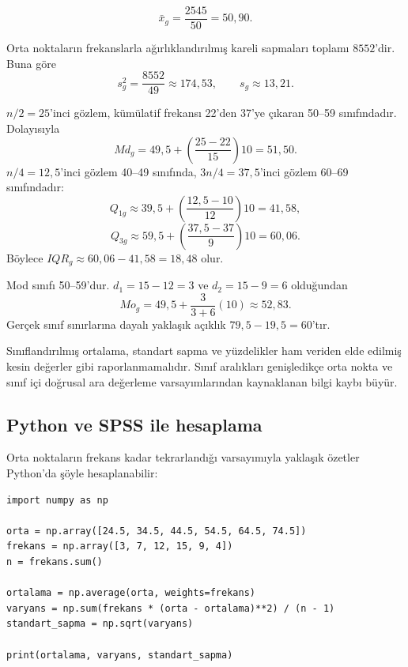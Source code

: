 
\[
\bar{x}_g=\frac{2545}{50}=50{,}90.
\]


Orta noktaların frekanslarla ağırlıklandırılmış kareli sapmaları toplamı
$8552$'dir. Buna göre
\[
s_g^2=\frac{8552}{49}\approx174{,}53,
\qquad
s_g\approx13{,}21.
\]


$n/2=25$'inci gözlem, kümülatif frekansı 22'den 37'ye çıkaran 50--59
sınıfındadır. Dolayısıyla
\[
Md_g=49{,}5+\left(\frac{25-22}{15}\right)10=51{,}50.
\]
$n/4=12{,}5$'inci gözlem 40--49 sınıfında,
$3n/4=37{,}5$'inci gözlem 60--69 sınıfındadır:
\[
Q_{1g}\approx39{,}5+\left(\frac{12{,}5-10}{12}\right)10=41{,}58,
\]
\[
Q_{3g}\approx59{,}5+\left(\frac{37{,}5-37}{9}\right)10=60{,}06.
\]
Böylece $IQR_g\approx60{,}06-41{,}58=18{,}48$ olur.


Mod sınıfı 50--59'dur. $d_1=15-12=3$ ve $d_2=15-9=6$ olduğundan
\[
Mo_g=49{,}5+\frac{3}{3+6}(10)\approx52{,}83.
\]
Gerçek sınıf sınırlarına dayalı yaklaşık açıklık $79{,}5-19{,}5=60$'tır.

\begin{mistakebox}
Sınıflandırılmış ortalama, standart sapma ve yüzdelikler ham veriden elde
edilmiş kesin değerler gibi raporlanmamalıdır. Sınıf aralıkları genişledikçe
orta nokta ve sınıf içi doğrusal ara değerleme varsayımlarından kaynaklanan
bilgi kaybı büyür.
\end{mistakebox}

\subsection{Python ve SPSS ile hesaplama}

Orta noktaların frekans kadar tekrarlandığı varsayımıyla yaklaşık özetler
Python'da şöyle hesaplanabilir:

\begin{lstlisting}
import numpy as np

orta = np.array([24.5, 34.5, 44.5, 54.5, 64.5, 74.5])
frekans = np.array([3, 7, 12, 15, 9, 4])
n = frekans.sum()

ortalama = np.average(orta, weights=frekans)
varyans = np.sum(frekans * (orta - ortalama)**2) / (n - 1)
standart_sapma = np.sqrt(varyans)

print(ortalama, varyans, standart_sapma)
\end{lstlisting}

